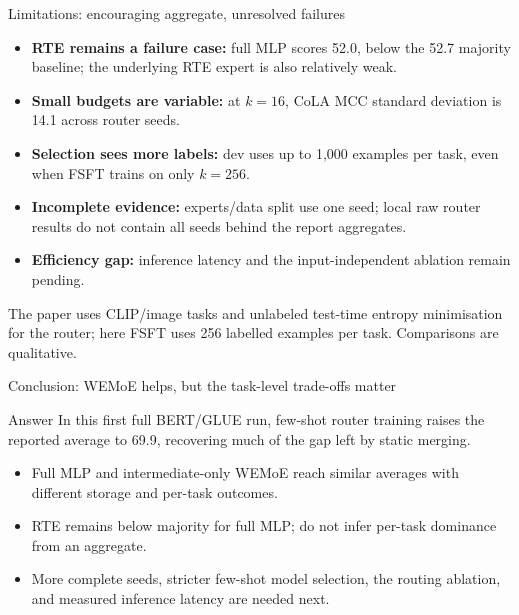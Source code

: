 \documentclass[aspectratio=169,10pt]{beamer}
\begin{document}
\begin{frame}{Limitations: encouraging aggregate, unresolved failures}
  \begin{itemize}
    \item \textbf{RTE remains a failure case:} full MLP scores 52.0, below the 52.7 majority baseline; the underlying RTE expert is also relatively weak.
    \item \textbf{Small budgets are variable:} at $k=16$, CoLA MCC standard deviation is 14.1 across router seeds.
    \item \textbf{Selection sees more labels:} dev uses up to 1,000 examples per task, even when FSFT trains on only $k=256$.
    \item \textbf{Incomplete evidence:} experts/data split use one seed; local raw router results do not contain all seeds behind the report aggregates.
    \item \textbf{Efficiency gap:} inference latency and the input-independent ablation remain pending.
  \end{itemize}
  \vfill
  \centering
  \small The paper uses CLIP/image tasks and unlabeled test-time entropy minimisation for the router; here FSFT uses 256 labelled examples per task. Comparisons are qualitative.\cite{tang2024wemoe}
\end{frame}

\begin{frame}{Conclusion: WEMoE helps, but the task-level trade-offs matter}
  \begin{block}{Answer}
    In this first full BERT/GLUE run, few-shot router training raises the reported average to 69.9, recovering much of the gap left by static merging.
  \end{block}
  \begin{itemize}
    \item Full MLP and intermediate-only WEMoE reach similar averages with different storage and per-task outcomes.
    \item RTE remains below majority for full MLP; do not infer per-task dominance from an aggregate.
    \item More complete seeds, stricter few-shot model selection, the routing ablation, and measured inference latency are needed next.
  \end{itemize}
\end{frame}
\end{document}
